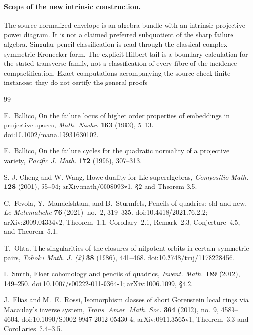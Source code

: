 \documentclass[11pt,reqno]{amsart}
\numberwithin{equation}{section}
\theoremstyle{definition}\newtheorem{definition}[theorem]{Definition}
\theoremstyle{remark}\newtheorem{remark}[theorem]{Remark}
\begin{document}
\paragraph{Scope of the new intrinsic construction.}
The source-normalized envelope is an algebra bundle with an intrinsic
projective power diagram. It is not a claimed preferred subquotient
of the sharp failure algebra. Singular-pencil classification is read
through the classical complex symmetric Kronecker form. The explicit
Hilbert tail is a boundary calculation for the stated transverse
family, not a classification of every fibre of the incidence
compactification. Exact computations accompanying the source check
finite instances; they do not certify the general proofs.
\begin{thebibliography}{99}

E.~Ballico,
On the failure locus of higher order properties of embeddings in
projective spaces,
\emph{Math. Nachr.} \textbf{163} (1993), 5--13.
doi:10.1002/mana.19931630102.

E.~Ballico,
On the failure cycles for the quadratic normality of a projective
variety,
\emph{Pacific J. Math.} \textbf{172} (1996), 307--313.

S.-J. Cheng and W. Wang, Howe duality for Lie superalgebras,
\emph{Compositio Math.} \textbf{128} (2001), 55--94;
arXiv:math/0008093v1, \S2 and Theorem 3.5.

C.~Fevola, Y.~Mandelshtam, and B.~Sturmfels,
Pencils of quadrics: old and new,
\emph{Le Matematiche} \textbf{76} (2021), no.~2, 319--335.
doi:10.4418/2021.76.2.2; arXiv:2009.04334v2,
Theorem~1.1, Corollary~2.1, Remark~2.3, Conjecture~4.5, and Theorem~5.1.

T.~Ohta, The singularities of the closures of nilpotent orbits in certain
symmetric pairs, \emph{Tohoku Math. J. (2)} \textbf{38} (1986), 441--468.
doi:10.2748/tmj/1178228456.

I.~Smith, Floer cohomology and pencils of quadrics,
\emph{Invent. Math.} \textbf{189} (2012), 149--250.
doi:10.1007/s00222-011-0364-1; arXiv:1006.1099, \S4.2.

J.~Elias and M.~E.~Rossi,
Isomorphism classes of short Gorenstein local rings via Macaulay's
inverse system,
\emph{Trans. Amer. Math. Soc.} \textbf{364} (2012), no.~9, 4589--4604.
doi:10.1090/S0002-9947-2012-05430-4;
arXiv:0911.3565v1, Theorem~3.3 and Corollaries~3.4--3.5.


\end{thebibliography}
\end{document}
